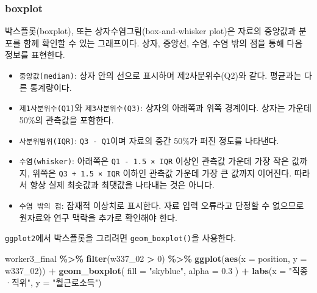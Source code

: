 \documentclass[
]{book}
\newenvironment{Shaded}{\begin{snugshade}}{\end{snugshade}}
\newcommand{\AttributeTok}[1]{\textcolor[rgb]{0.13,0.29,0.53}{#1}}
\newcommand{\DecValTok}[1]{\textcolor[rgb]{0.00,0.00,0.81}{#1}}
\newcommand{\FloatTok}[1]{\textcolor[rgb]{0.00,0.00,0.81}{#1}}
\newcommand{\FunctionTok}[1]{\textcolor[rgb]{0.13,0.29,0.53}{\textbf{#1}}}
\newcommand{\NormalTok}[1]{#1}
\newcommand{\SpecialCharTok}[1]{\textcolor[rgb]{0.81,0.36,0.00}{\textbf{#1}}}
\newcommand{\StringTok}[1]{\textcolor[rgb]{0.31,0.60,0.02}{#1}}
\providecommand{\tightlist}{%
  \setlength{\itemsep}{0pt}\setlength{\parskip}{0pt}}
\begin{document}
\subsubsection{boxplot}\label{boxplot}

박스플롯(boxplot), 또는 상자수염그림(box-and-whisker plot)은 자료의 중앙값과 분포를 함께 확인할 수 있는 그래프이다. 상자, 중앙선, 수염, 수염 밖의 점을 통해 다음 정보를 표현한다.

\begin{itemize}
\tightlist
\item
  \texttt{중앙값(median)}: 상자 안의 선으로 표시하며 제2사분위수(Q2)와 같다. 평균과는 다른 통계량이다.
\item
  \texttt{제1사분위수(Q1)}와 \texttt{제3사분위수(Q3)}: 상자의 아래쪽과 위쪽 경계이다. 상자는 가운데 50\%의 관측값을 포함한다.
\item
  \texttt{사분위범위(IQR)}: \texttt{Q3\ -\ Q1}이며 자료의 중간 50\%가 퍼진 정도를 나타낸다.
\item
  \texttt{수염(whisker)}: 아래쪽은 \texttt{Q1\ -\ 1.5\ ×\ IQR} 이상인 관측값 가운데 가장 작은 값까지, 위쪽은 \texttt{Q3\ +\ 1.5\ ×\ IQR} 이하인 관측값 가운데 가장 큰 값까지 이어진다. 따라서 항상 실제 최솟값과 최댓값을 나타내는 것은 아니다.
\item
  \texttt{수염\ 밖의\ 점}: 잠재적 이상치로 표시한다. 자료 입력 오류라고 단정할 수 없으므로 원자료와 연구 맥락을 추가로 확인해야 한다.
\end{itemize}

\texttt{ggplot2}에서 박스플롯을 그리려면 \texttt{geom\_boxplot()}을 사용한다.

\begin{Shaded}
\begin{Highlighting}[]
\NormalTok{worker3\_final }\SpecialCharTok{\%\textgreater{}\%}
  \FunctionTok{filter}\NormalTok{(w337\_02 }\SpecialCharTok{\textgreater{}} \DecValTok{0}\NormalTok{) }\SpecialCharTok{\%\textgreater{}\%}
  \FunctionTok{ggplot}\NormalTok{(}\FunctionTok{aes}\NormalTok{(}\AttributeTok{x =}\NormalTok{ position, }\AttributeTok{y =}\NormalTok{ w337\_02)) }\SpecialCharTok{+}
  \FunctionTok{geom\_boxplot}\NormalTok{(}
    \AttributeTok{fill =} \StringTok{"skyblue"}\NormalTok{,}
    \AttributeTok{alpha =} \FloatTok{0.3}
\NormalTok{  ) }\SpecialCharTok{+}
  \FunctionTok{labs}\NormalTok{(}\AttributeTok{x =} \StringTok{"직종·직위"}\NormalTok{, }\AttributeTok{y =} \StringTok{"월근로소득"}\NormalTok{)}
\end{Highlighting}
\end{Shaded}
\end{document}
